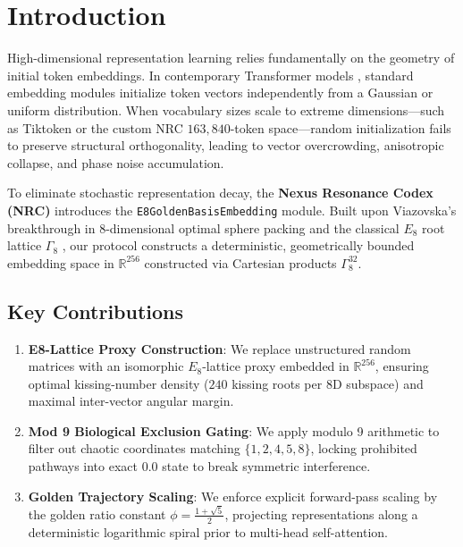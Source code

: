 \section{Introduction}

High-dimensional representation learning relies fundamentally on the geometry of initial token embeddings. In contemporary Transformer models \cite{vaswani2017attention}, standard embedding modules initialize token vectors independently from a Gaussian or uniform distribution. When vocabulary sizes scale to extreme dimensions—such as Tiktoken or the custom NRC $163,840$-token space—random initialization fails to preserve structural orthogonality, leading to vector overcrowding, anisotropic collapse, and phase noise accumulation.

To eliminate stochastic representation decay, the \textbf{Nexus Resonance Codex (NRC)} introduces the \texttt{E8GoldenBasisEmbedding} module. Built upon Viazovska's breakthrough in 8-dimensional optimal sphere packing \cite{viazovska2017sphere} and the classical $E_8$ root lattice $\Gamma_8$ \cite{conway1999sphere}, our protocol constructs a deterministic, geometrically bounded embedding space in $\mathbb{R}^{256}$ constructed via Cartesian products $\Gamma_8^{32}$.

\subsection{Key Contributions}
\begin{enumerate}[label=\textbf{\arabic*.}]
    \item \textbf{E8-Lattice Proxy Construction}: We replace unstructured random matrices with an isomorphic $E_8$-lattice proxy embedded in $\mathbb{R}^{256}$, ensuring optimal kissing-number density ($240$ kissing roots per 8D subspace) and maximal inter-vector angular margin.
    \item \textbf{Mod 9 Biological Exclusion Gating}: We apply modulo 9 arithmetic to filter out chaotic coordinates matching $\{1, 2, 4, 5, 8\}$, locking prohibited pathways into exact $0.0$ state to break symmetric interference.
    \item \textbf{Golden Trajectory Scaling}: We enforce explicit forward-pass scaling by the golden ratio constant $\phi = \frac{1+\sqrt{5}}{2}$, projecting representations along a deterministic logarithmic spiral prior to multi-head self-attention.
\end{enumerate}
